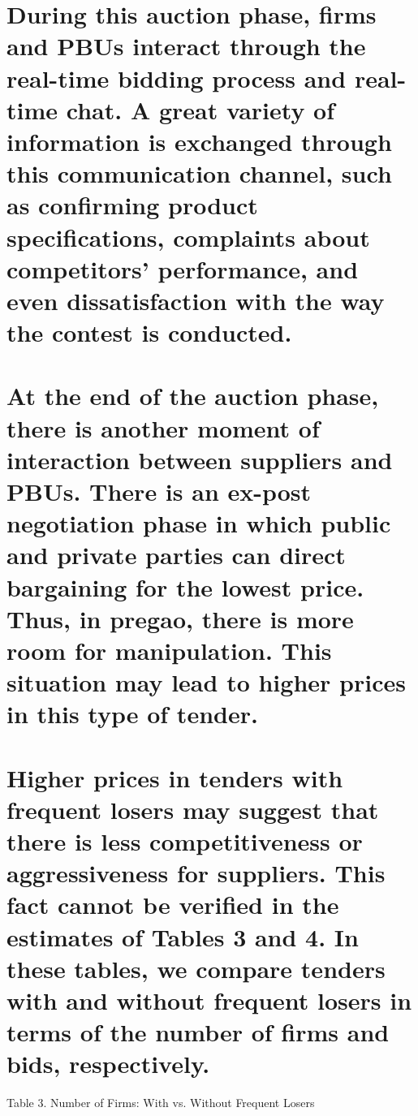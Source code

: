 {{\section{During this auction phase, firms and PBUs interact through the real-time bidding process and real-time chat. A great variety of information is exchanged through this communication channel, such as confirming product specifications, complaints about competitors' performance, and even dissatisfaction with the way the contest is conducted.}

\section{At the end of the auction phase, there is another moment of interaction between suppliers and PBUs. There is an ex-post negotiation phase in which public and private parties can direct bargaining for the lowest price. Thus, in pregao, there is more room for manipulation. This situation may lead to higher prices in this type of tender.}

\section{Higher prices in tenders with frequent losers may suggest that there is less competitiveness or aggressiveness for suppliers. This fact cannot be verified in the estimates of Tables 3 and 4. In these tables, we compare tenders with and without frequent losers in terms of the number of firms and bids, respectively.}

\vspace{1\baselineskip}
\begin{center}
Table 3. Number of Firms: With vs. Without Frequent Losers
\end{center}


}}
